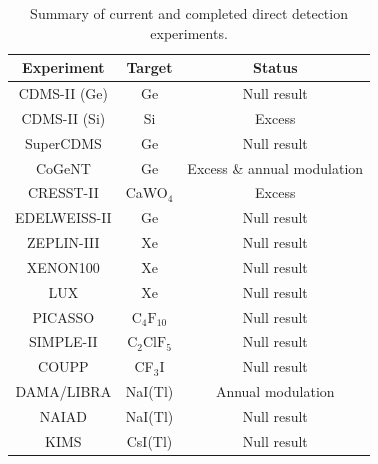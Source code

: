 \begin{table}
	\begin{tabular}{ccc}
		\hline\hline
		Experiment & Target & Status \\
		\hline
		CDMS-II (Ge) \cite{Ahmed:2009,Ahmed:2011} & Ge & Null result \\
                CDMS-II (Si) \cite{Agnese:2013} & Si & Excess \\
                SuperCDMS \cite{Agnese:2014} & Ge & Null result \\
		CoGeNT \cite{Aalseth:2011a,Aalseth:2011b, Aalseth:2013,Aalseth:2014a,Aalseth:2014b} & Ge & Excess \& annual modulation\\
		CRESST-II \cite{Angloher:2012} & CaWO\(_4\) & Excess\\
		EDELWEISS-II \cite{Armengaud:2011} &  Ge & Null result \\
		ZEPLIN-III \cite{Akimov:2012} & Xe & Null result\\
		XENON100 \cite{Aprile:2011, Aprile:2012b} & Xe & Null result \\
                LUX \cite{Akerib:2014} & Xe & Null result \\
		PICASSO \cite{Archambault:2012} & \(\textrm{C}_4\textrm{F}_{10}\) & Null result \\
		SIMPLE-II \cite{Felizardo:2012} & \(\textrm{C}_2 \textrm{ClF}_5\) & Null result \\
		COUPP \cite{Behnke:2011} & CF\(_3\)I & Null result \\
		DAMA/LIBRA \cite{Bernabei:2008a,Bernabei:2010,Bernabei:2013} &  NaI(Tl) & Annual modulation\\
                NAIAD \cite{Ahmed:2003} & NaI(Tl) & Null result \\
		KIMS \cite{Lee:2007} & CsI(Tl) & Null result \\
		\hline\hline
		\end{tabular}
	\caption{Summary of current and completed direct detection experiments.}
	\label{DD:tab:ExptSummary}
\end{table}





